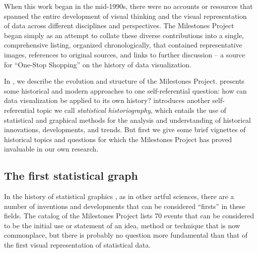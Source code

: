 When this work began in the mid-1990s, there were no accounts or resources that spanned the entire development of visual thinking and the visual representation of data across different disciplines and perspectives. The Milestones Project began simply as an attempt to collate these diverse contributions into a single, comprehensive listing, organized chronologically, that contained representative images, references to original sources, and links to further discussion -- a source for ``One-Stop Shopping'' on the history of data visualization.

In , we describe the evolution and structure of the Milestones Project.  presents some historical and modern approaches to one self-referential question: how can data visualization be applied to its own history?  introduces another self-referential topic we call \emph{statistical historiography}, which entails the use of statistical and graphical methods for the analysis and understanding of historical innovations, developments, and trends. But first we give some brief vignettes of historical topics and questions for which the Milestones Project has proved invaluable in our own research.

\subsection{The first statistical graph}
In the history of statistical graphics \citep{Friendly:06:hbook}, as in other artful sciences, there are a number of inventions and developments that can be considered ``firsts'' in these fields. The catalog of the Milestones Project \citep{FriendlyDenis:01} lists 70 events that can be considered to be the initial use or statement of an idea, method or technique that is now commonplace, but there is probably no question more fundamental than that of the first visual representation of statistical data.

